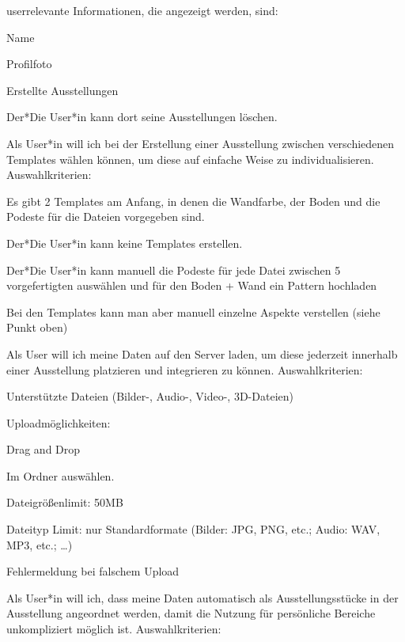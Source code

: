 \begin{compactenum}
\begin{compactitem}
        \item userrelevante Informationen, die angezeigt werden, sind: 
        \item Name
        \item Profilfoto
        \item Erstellte Ausstellungen
        \item Der*Die User*in kann dort seine Ausstellungen löschen.         
    \end{compactitem} 
    \item  Als User*in will ich bei der Erstellung einer Ausstellung zwischen verschiedenen Templates wählen können, um diese auf einfache Weise zu individualisieren. Auswahlkriterien: 
    \begin{compactitem}
        \item Es gibt 2 Templates am Anfang, in denen die Wandfarbe, der Boden und die Podeste für die Dateien vorgegeben sind.
        \item Der*Die User*in kann keine Templates erstellen.
        \item Der*Die User*in kann manuell die Podeste für jede Datei zwischen 5 vorgefertigten auswählen und für den Boden + Wand ein Pattern hochladen
        \item Bei den Templates kann man aber manuell einzelne Aspekte verstellen (siehe Punkt oben)
    \end{compactitem} 
    \item Als User will ich meine Daten auf den Server laden, um diese jederzeit innerhalb einer Ausstellung platzieren und integrieren zu können. Auswahlkriterien: 
    \begin{compactitem}
        \item Unterstützte Dateien (Bilder-, Audio-, Video-, 3D-Dateien) 
        \item Uploadmöglichkeiten: 
        \begin{compactitem}
            \item Drag and Drop
            \item Im Ordner auswählen.
        \end{compactitem} 
        \item Dateigrößenlimit: 50MB
        \item Dateityp Limit: nur Standardformate (Bilder: JPG, PNG, etc.;        Audio: WAV, MP3, etc.; …)
        \item Fehlermeldung bei falschem Upload
    \end{compactitem} 
    \item  Als User*in will ich, dass meine Daten automatisch als Ausstellungsstücke in der Ausstellung angeordnet werden, damit die Nutzung für persönliche Bereiche unkompliziert möglich ist. Auswahlkriterien: 

\end{compactenum}
